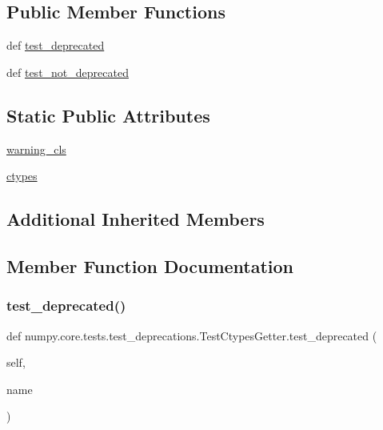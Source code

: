 \subsection*{Public Member Functions}
\begin{DoxyCompactItemize}
\item 
def \hyperlink{classnumpy_1_1core_1_1tests_1_1test__deprecations_1_1TestCtypesGetter_ac009a5eb3c7f1ab9f669c16b54908779}{test\+\_\+deprecated}
\item 
def \hyperlink{classnumpy_1_1core_1_1tests_1_1test__deprecations_1_1TestCtypesGetter_adf947e84b68f0427f0db9774bbe42d72}{test\+\_\+not\+\_\+deprecated}
\end{DoxyCompactItemize}
\subsection*{Static Public Attributes}
\begin{DoxyCompactItemize}
\item 
\hyperlink{classnumpy_1_1core_1_1tests_1_1test__deprecations_1_1TestCtypesGetter_a7e94d97494ac61a57904655689c5f901}{warning\+\_\+cls}
\item 
\hyperlink{classnumpy_1_1core_1_1tests_1_1test__deprecations_1_1TestCtypesGetter_aa8737c4b83dc2f735fd39f6f48388d90}{ctypes}
\end{DoxyCompactItemize}
\subsection*{Additional Inherited Members}


\subsection{Member Function Documentation}
\mbox{\label{classnumpy_1_1core_1_1tests_1_1test__deprecations_1_1TestCtypesGetter_ac009a5eb3c7f1ab9f669c16b54908779}} 
\subsubsection{\texorpdfstring{test\+\_\+deprecated()}{test\_deprecated()}}
{\footnotesize\ttfamily def numpy.\+core.\+tests.\+test\+\_\+deprecations.\+Test\+Ctypes\+Getter.\+test\+\_\+deprecated (\begin{DoxyParamCaption}\item[{}]{self,  }\item[{}]{name }\end{DoxyParamCaption})}

